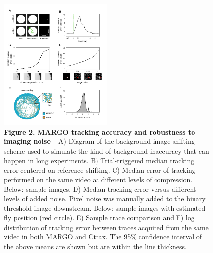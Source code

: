 \documentclass[10pt]{article}
\begin{document}
\clearpage
\begin{figure}[t!]
	\begin{center}
		\includegraphics[width=0.5\textwidth]{../figures/autotracker_performance.pdf}
	\end{center}
	\caption*{\footnotesize \textbf{Figure 2. MARGO tracking accuracy and robustness to imaging noise} -- A) Diagram of the background image shifting scheme used to simulate the kind of background inaccuracy that can happen in long experiments. B) Trial-triggered median tracking error centered on reference shifting. C) Median error of tracking performed on the same video at different levels of compression. Below: sample images. D) Median tracking error versus different levels of added noise. Pixel noise was manually added to the binary threshold image downstream. Below: sample images with estimated fly position (red circle). E) Sample trace comparison and F) log distribution of tracking error between traces acquired from the same video in both MARGO and Ctrax. The 95\% confidence interval of the above means are shown but are within the line thickness.}
\end{figure}
\end{document}

